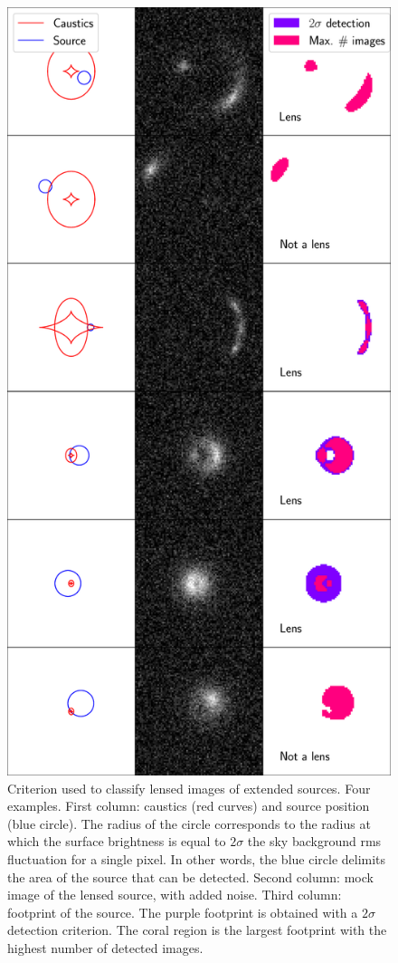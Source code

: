 \documentclass{aa}
\begin{document}
\begin{figure}
\includegraphics[width=\columnwidth]{example_detections.eps}
\caption{
Criterion used to classify lensed images of extended sources. Four examples.
First column: caustics (red curves) and source position (blue circle). The radius of the circle corresponds to the radius at which the surface brightness is equal to $2\sigma$ the sky background rms fluctuation for a single pixel. In other words, the blue circle delimits the area of the source that can be detected.
Second column: mock image of the lensed source, with added noise.
Third column: footprint of the source. The purple footprint is obtained with a $2\sigma$ detection criterion. The coral region is the largest footprint with the highest number of detected images.
\label{fig:lensdef}
}
\end{figure}
\end{document}
